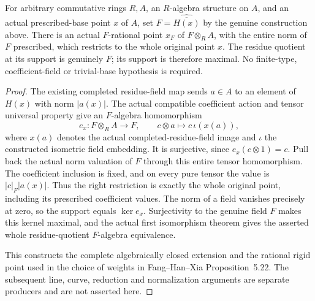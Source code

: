 \begin{theorem}
\label{spectrum:rigid-complete-algebraic-closure-lift}
\leanok
{}
For arbitrary commutative rings $R,A$, an $R$-algebra structure on $A$,
and an actual prescribed-base point $x$ of $A$, set
$F=\widehat{\overline{H(x)}}$ by the genuine construction above. There is
an actual $F$-rational point $x_F$ of $F\otimes_RA$, with the entire norm
of $F$ prescribed, which restricts to the whole original point $x$.
The residue quotient at its support is genuinely $F$; its support is
therefore maximal. No finite-type, coefficient-field or trivial-base
hypothesis is required.
\end{theorem}
\begin{proof}
The existing completed residue-field map sends $a\in A$ to an element
of $H(x)$ with norm $|a(x)|$. The actual compatible coefficient action
and tensor universal property give an $F$-algebra homomorphism
\[
 e_x:F\otimes_RA\longrightarrow F,
 \qquad c\otimes a\longmapsto c\,\iota(x(a)),
\]
where $x(a)$ denotes the actual completed-residue-field image and $\iota$
the constructed isometric field embedding. It is surjective, since
$e_x(c\otimes1)=c$.
Pull back the actual norm valuation of $F$ through this entire tensor
homomorphism. The coefficient inclusion is fixed, and on every pure
tensor the value is $|c|_F|a(x)|$. Thus the right restriction is exactly
the whole original point, including its prescribed coefficient values.
The norm of a field vanishes precisely at zero, so the support equals
$\ker e_x$. Surjectivity to the genuine field $F$ makes this kernel
maximal, and the actual first isomorphism theorem gives the asserted
whole residue-quotient $F$-algebra equivalence.

This constructs the complete algebraically closed extension and the
rational rigid point used in the choice of weights in Fang--Han--Xia
Proposition~5.22. The subsequent line, curve, reduction and normalization
arguments are separate producers and are not asserted here.
\end{proof}
